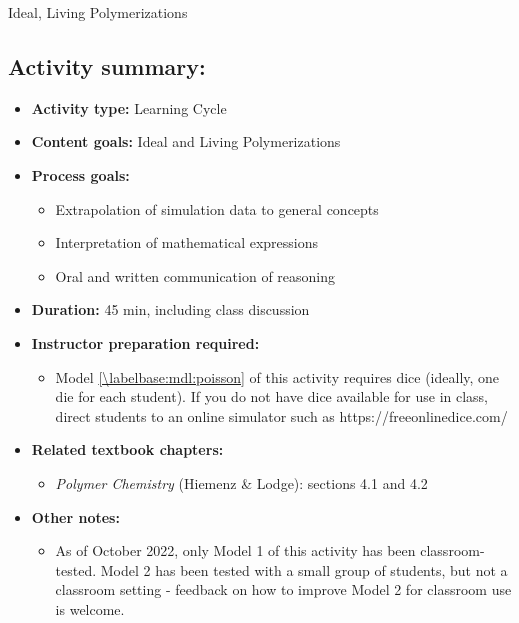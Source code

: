 \begin{activity}{Ideal, Living Polymerizations}
\begin{instructornotes}
	\subsection*{Activity summary:}
	\begin{itemize}
		\item \textbf{Activity type:} Learning Cycle
		\item \textbf{Content goals:} Ideal and Living Polymerizations
		\item \textbf{Process goals:} %
			\begin{itemize}
				\item Extrapolation of simulation data to general concepts
				\item Interpretation of mathematical expressions
				\item Oral and written communication of reasoning
			\end{itemize}
		\item \textbf{Duration:} 45 min, including class discussion
		\item \textbf{Instructor preparation required:}
			\begin{itemize}
				\item Model \ref{\labelbase:mdl:poisson} of this activity requires dice (ideally, one die for each student).  If you do not have dice available for use in class, direct students to an online simulator such as https://freeonlinedice.com/
			\end{itemize}
		\item \textbf{Related textbook chapters:}
			\begin{itemize}
				\item \emph{Polymer Chemistry} (Hiemenz \& Lodge): sections 4.1 and 4.2
			\end{itemize}
		\item \textbf{Other notes:}
			\begin{itemize}
				\item As of October 2022, only Model 1 of this activity has been classroom-tested.  Model 2 has been tested with a small group of students, but not a classroom setting - feedback on how to improve Model 2 for classroom use is welcome.
			\end{itemize}
	\end{itemize}
	

\end{instructornotes}
\end{activity}
